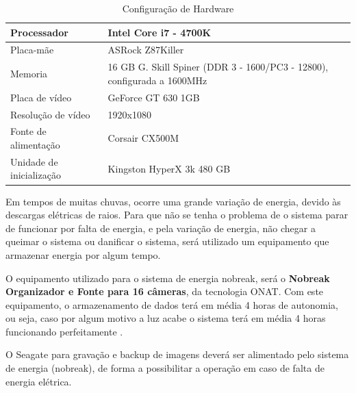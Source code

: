 \begin{table}[H]
\centering
\begin{tabular}{|p{5cm}|p{10cm}|}
\hline
Processador              & Intel Core i7 - 4700K                                                   \\ \hline
Placa-mãe                & ASRock Z87Killer                                                        \\ \hline
Memoria                  & 16 GB G. Skill Spiner (DDR 3 - 1600/PC3 - 12800), configurada a 1600MHz \\ \hline
Placa de vídeo           & GeForce GT 630 1GB                                                      \\ \hline
Resolução de vídeo       & 1920x1080                                                               \\ \hline
Fonte de alimentação     & Corsair CX500M                                                          \\ \hline
Unidade de inicialização & Kingston HyperX 3k 480 GB                                               \\ \hline
\end{tabular}
\caption{Configuração de Hardware}
\label{tab:configHardware}
\end{table}

Em tempos de muitas chuvas, ocorre uma grande variação de energia, devido às descargas
elétricas de raios. Para que não se tenha o problema de o sistema parar de funcionar por falta de
energia, e pela variação de energia, não chegar a queimar o sistema ou danificar o sistema,
será utilizado um equipamento que armazenar energia por algum tempo.

O equipamento utilizado para o sistema de energia nobreak, será o \textbf{Nobreak Organizador e
Fonte para 16 câmeras}, da tecnologia ONAT. Com este equipamento, o armazenamento de
dados terá em média 4 horas de autonomia, ou seja, caso por algum motivo a luz acabe o
sistema terá em média 4 horas funcionando perfeitamente \cite{nobreak}.

O Seagate para gravação e backup de imagens deverá ser alimentado pelo sistema de energia
(nobreak), de forma a possibilitar a operação em caso de falta de energia elétrica.

